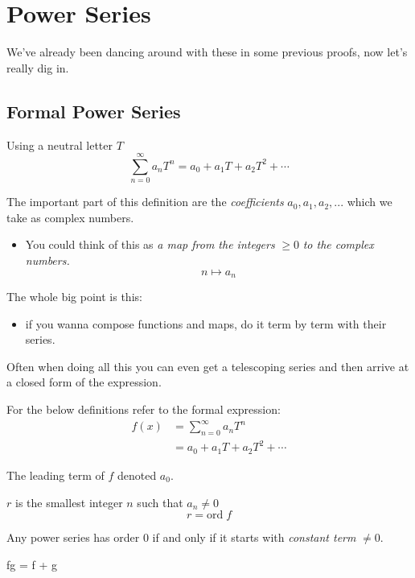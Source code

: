 \chapter{Power Series}
We've already been dancing around with these in some previous proofs, now let's really dig in. 
\section{Formal Power Series}
\begin{defn}
  Using a neutral letter $T$
  \[\sum_{n = 0}^{\infty}a_n T^n = a_0 + a_1 T + a_2 T^2 + \cdots \]
\end{defn}
The important part of this definition are the \textit{coefficients} $a_0, a_1, a_2, ...$ which we 
take as complex numbers.
\begin{itemize}
  \item You could think of this as \textit{a map from the integers} $ \geq 0 $ \textit{to the complex numbers.}
  \[n \mapsto a_n \]
\end{itemize}

The whole big point is this: 
  \begin{itemize}
    \item if you wanna compose functions and maps, do it term by term with their series.
  \end{itemize}
Often when doing all this you can even get a telescoping series and then arrive at a closed form of the expression.

For the below definitions refer to the formal expression:
\begin{align*}
  f(x) &= \sum_{n = 0}^{\infty} a_n T^n \\
  &= a_0 + a_1 T + a_2 T^2 + \cdots
\end{align*}
\begin{defn}
  The leading term of $f$ denoted $a_0$.
\end{defn}

\begin{defn}
  $r$ is the smallest integer $n$ such that $a_n \not = 0$
  \[r = \text{ord}\; f\]
\end{defn}

\begin{thm}
  Any power series has order $0$ if and only if it starts with \textit{constant term} $\not = 0.$
\end{thm}

\begin{thm}
  \; fg = \; f + \; g
\end{thm}

